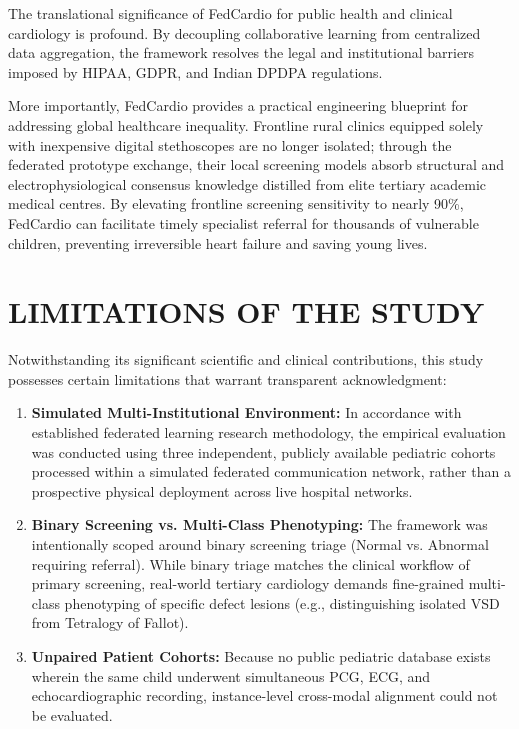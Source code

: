 \documentclass[12pt,a4paper]{amritareport}
\begin{document}
The translational significance of FedCardio for public health and clinical cardiology is profound. By decoupling collaborative learning from centralized data aggregation, the framework resolves the legal and institutional barriers imposed by HIPAA, GDPR, and Indian DPDPA regulations. 

More importantly, FedCardio provides a practical engineering blueprint for addressing global healthcare inequality. Frontline rural clinics equipped solely with inexpensive digital stethoscopes are no longer isolated; through the federated prototype exchange, their local screening models absorb structural and electrophysiological consensus knowledge distilled from elite tertiary academic medical centres. By elevating frontline screening sensitivity to nearly 90\%, FedCardio can facilitate timely specialist referral for thousands of vulnerable children, preventing irreversible heart failure and saving young lives.


\section{LIMITATIONS OF THE STUDY}

Notwithstanding its significant scientific and clinical contributions, this study possesses certain limitations that warrant transparent acknowledgment:
\begin{enumerate}
	\item \textbf{Simulated Multi-Institutional Environment:} In accordance with established federated learning research methodology, the empirical evaluation was conducted using three independent, publicly available pediatric cohorts processed within a simulated federated communication network, rather than a prospective physical deployment across live hospital networks.
	\item \textbf{Binary Screening vs. Multi-Class Phenotyping:} The framework was intentionally scoped around binary screening triage (Normal vs. Abnormal requiring referral). While binary triage matches the clinical workflow of primary screening, real-world tertiary cardiology demands fine-grained multi-class phenotyping of specific defect lesions (e.g., distinguishing isolated VSD from Tetralogy of Fallot).
	\item \textbf{Unpaired Patient Cohorts:} Because no public pediatric database exists wherein the same child underwent simultaneous PCG, ECG, and echocardiographic recording, instance-level cross-modal alignment could not be evaluated.
\end{enumerate}
\end{document}
